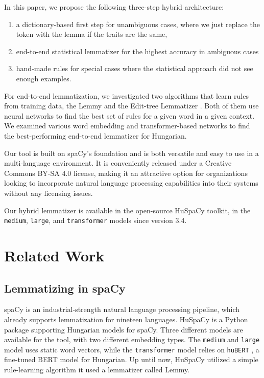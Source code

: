 \documentclass{llncs}
\newcommand{\hubert}{\texttt{huBERT}}
\begin{document}
In this paper, we propose the following three-step hybrid architecture: 
\begin{enumerate}
    \item a dictionary-based first step for unambiguous cases, where we just replace the token with the lemma if the traits are the same,
    \item end-to-end statistical lemmatizer for the highest accuracy in ambiguous cases
    \item hand-made rules for special cases where the statistical approach did not see enough examples.
\end{enumerate}

For end-to-end lemmatization, we investigated two algorithms that learn rules from training data, the Lemmy \citep{lemmy} and the Edit-tree Lemmatizer \citep{spacy-edit-tree}. Both of them use neural networks to find the best set of rules for a given word in a given context. We examined various word embedding and transformer-based networks to find the best-performing end-to-end lemmatizer for Hungarian.

Our tool is built on spaCy's foundation and is both versatile and easy to use in a multi-language environment. It is conveniently released under a Creative Commons BY-SA 4.0 license, making it an attractive option for organizations looking to incorporate natural language processing capabilities into their systems without any licensing issues.

Our hybrid lemmatizer is available in the open-source HuSpaCy toolkit, in the \texttt{medium}, \texttt{large}, and \texttt{transformer} models since version 3.4.

\section{Related Work}

\subsection{Lemmatizing in spaCy}

spaCy \citep{spacy} is an industrial-strength natural language processing pipeline, which already supports lemmatization for nineteen languages. HuSpaCy \citep{HuSpaCy:2021} is a Python package supporting Hungarian models for spaCy. Three different models are available for the tool, with two different embedding types. The \texttt{medium} and \texttt{large} model uses static word vectors, while the \texttt{transformer} model relies on \hubert{} \citep{hubert}, a fine-tuned BERT \citep{https://doi.org/10.48550/arxiv.1810.04805} model for Hungarian. Up until now, HuSpaCy utilized a simple rule-learning algorithm it used a lemmatizer called Lemmy.
\end{document}
